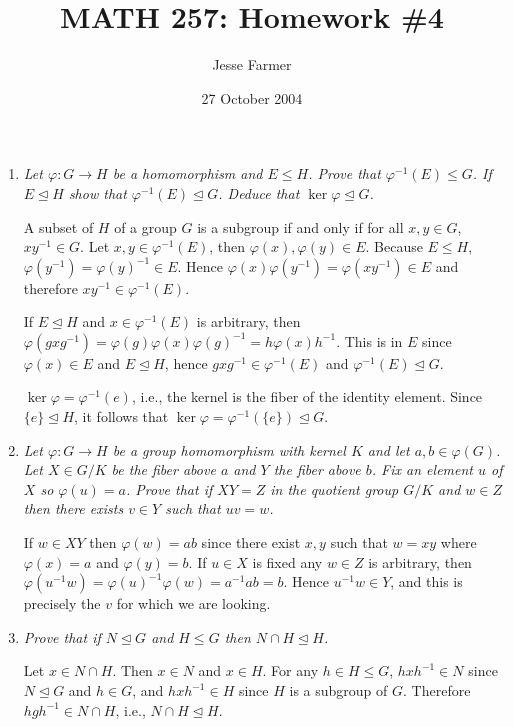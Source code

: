 \documentclass[letterpaper, 11pt]{article}
\title{MATH 257: Homework \#4}
\author{Jesse Farmer}
\date{27 October 2004}
\begin{document}
\maketitle
\begin{enumerate}

\item \emph{Let $\varphi: G \rightarrow H$ be a homomorphism and $E \leq H$.  Prove that $\varphi^{-1}(E) \leq G$.  If $E \unlhd H$ show that $\varphi^{-1}(E) \unlhd G$.  Deduce that $\ker \varphi \unlhd G$.}

A subset of $H$ of a group $G$ is a subgroup if and only if for all $x,y \in G$, $xy^{-1} \in G$.  Let $x,y \in \varphi^{-1}(E)$, then $\varphi(x), \varphi(y) \in E$.  Because $E \leq H$, $\varphi(y^{-1}) = \varphi(y)^{-1} \in E$.  Hence $\varphi(x)\varphi(y^{-1}) = \varphi(xy^{-1}) \in E$ and therefore $xy^{-1} \in \varphi^{-1}(E)$.

If $E \unlhd H$ and $x \in \varphi^{-1}(E)$ is arbitrary, then $\varphi(gxg^{-1}) = \varphi(g)\varphi(x)\varphi(g)^{-1} = h\varphi(x)h^{-1}$.  This is in $E$ since $\varphi(x) \in E$ and $E \unlhd H$, hence $gxg^{-1} \in \varphi^{-1}(E)$ and $\varphi^{-1}(E) \unlhd G$.

$\ker \varphi = \varphi^{-1}(e)$, i.e., the kernel is the fiber of the identity element.  Since $\{e\} \unlhd H$, it follows that $\ker \varphi = \varphi^{-1}(\{e\}) \unlhd G$.

\item \emph{Let $\varphi: G \rightarrow H$ be a group homomorphism with kernel $K$ and let $a,b \in \varphi(G)$.  Let $X \in G / K$ be the fiber above $a$ and $Y$ the fiber above $b$.  Fix an element $u$ of $X$ so $\varphi(u) = a$.  Prove that if $XY = Z$ in the quotient group $G/K$ and $w \in Z$ then there exists $v \in Y$ such that $uv = w$.}

If $w \in XY$ then $\varphi(w) = ab$ since there exist $x,y$ such that $w=xy$ where $\varphi(x)=a$ and $\varphi(y)=b$.  If $u \in X$ is fixed any $w \in Z$ is arbitrary, then $\varphi(u^{-1}w) = \varphi(u)^{-1}\varphi(w) = a^{-1}ab = b$.  Hence $u^{-1}w \in Y$, and this is precisely the $v$ for which we are looking.

\item \emph{Prove that if $N \unlhd G$ and $H \leq G$ then $N \cap H \unlhd H$.}

Let $x \in N \cap H$.  Then $x \in N$ and $x \in H$.  For any $h \in H \leq G$, $hxh^{-1} \in N$ since $N \unlhd G$ and $h \in G$, and $hxh^{-1} \in H$ since $H$ is a subgroup of $G$.  Therefore $hgh^{-1} \in N \cap H$, i.e., $N \cap H \unlhd H$.


\end{enumerate}
\end{document}
